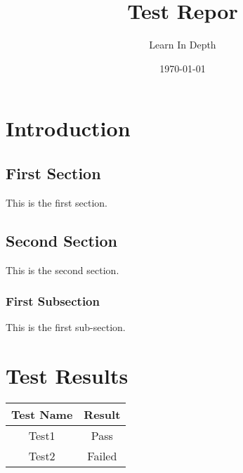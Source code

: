 \documentclass[12pt, letterpaper]{article}
\title{Test Repor}
\author{Learn In Depth}
\date{\today}
\begin{document}
\chapter{Introduction}

\section{First Section}

This is the first section.

\section{Second Section}

This is the second section.

\subsection{First Subsection}

This is the first sub-section.

\chapter{Test Results}

\begin{center}
    \begin{tabular}{||c | c ||}  \hline
        Test Name & Result \\ \hline\hline
        Test1 & Pass \\  \hline
        Test2 & Failed \\ \hline
   \end{tabular}
\end{center}
\end{document}
